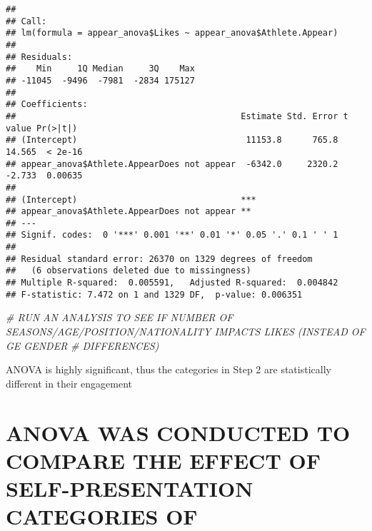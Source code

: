 \documentclass[
]{article}
\newenvironment{Shaded}{\begin{snugshade}}{\end{snugshade}}
\newcommand{\CommentTok}[1]{\textcolor[rgb]{0.56,0.35,0.01}{\textit{#1}}}
\newcommand{\FunctionTok}[1]{\textcolor[rgb]{0.00,0.00,0.00}{#1}}
\newcommand{\NormalTok}[1]{#1}
\newcommand{\OtherTok}[1]{\textcolor[rgb]{0.56,0.35,0.01}{#1}}
\newcommand{\SpecialCharTok}[1]{\textcolor[rgb]{0.00,0.00,0.00}{#1}}
\begin{document}
\begin{Shaded}
\end{Shaded}

\begin{verbatim}
## 
## Call:
## lm(formula = appear_anova$Likes ~ appear_anova$Athlete.Appear)
## 
## Residuals:
##    Min     1Q Median     3Q    Max 
## -11045  -9496  -7981  -2834 175127 
## 
## Coefficients:
##                                            Estimate Std. Error t value Pr(>|t|)
## (Intercept)                                 11153.8      765.8  14.565  < 2e-16
## appear_anova$Athlete.AppearDoes not appear  -6342.0     2320.2  -2.733  0.00635
##                                               
## (Intercept)                                ***
## appear_anova$Athlete.AppearDoes not appear ** 
## ---
## Signif. codes:  0 '***' 0.001 '**' 0.01 '*' 0.05 '.' 0.1 ' ' 1
## 
## Residual standard error: 26370 on 1329 degrees of freedom
##   (6 observations deleted due to missingness)
## Multiple R-squared:  0.005591,   Adjusted R-squared:  0.004842 
## F-statistic: 7.472 on 1 and 1329 DF,  p-value: 0.006351
\end{verbatim}

\begin{Shaded}
\begin{Highlighting}[]
\CommentTok{\# RUN AN ANALYSIS TO SEE IF NUMBER OF SEASONS/AGE/POSITION/NATIONALITY IMPACTS LIKES (INSTEAD OF GE GENDER}
\CommentTok{\# DIFFERENCES)}
\end{Highlighting}
\end{Shaded}

ANOVA is highly significant, thus the categories in Step 2 are
statistically different in their engagement

\hypertarget{anova-was-conducted-to-compare-the-effect-of-self-presentation-categories-of}{%
\section{ANOVA WAS CONDUCTED TO COMPARE THE EFFECT OF SELF-PRESENTATION
CATEGORIES
OF}\label{anova-was-conducted-to-compare-the-effect-of-self-presentation-categories-of}}
\end{document}
